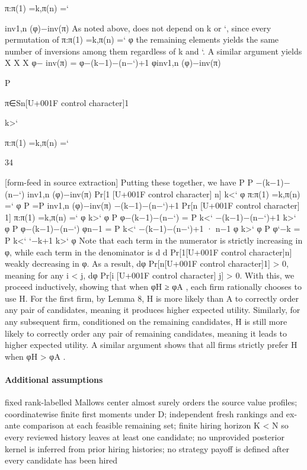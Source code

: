\documentclass[10pt]{article}
\begin{document}
\begin{ReviewVerbatim}
π:π(1) =k,π(n) =`

inv1,n (φ)−inv(π)
As noted above,
does not depend on k or `, since every permutation of
π:π(1) =k,π(n) =` φ
the remaining elements yields the same number of inversions among them regardless of k and `. A similar
argument yields
X
X
X
φ− inv(π) =
φ−(k−1)−(n−`)+1
φinv1,n (φ)−inv(π)

P

π∈Sn[U+001F control character]1

k>`

π:π(1) =k,π(n) =`

34


[form-feed in source extraction]
Putting these together, we have
P
P
−(k−1)−(n−`)
inv1,n (φ)−inv(π)
Pr[1 [U+001F control character] n]
k<` φ
π:π(1) =k,π(n) =` φ
P
=P
inv1,n (φ)−inv(π)
−(k−1)−(n−`)+1
Pr[n [U+001F control character] 1]
π:π(1) =k,π(n) =` φ
k>` φ
P
φ−(k−1)−(n−`)
= P k<` −(k−1)−(n−`)+1
k>` φ
P
φ−(k−1)−(n−`)
φn−1
= P k<` −(k−1)−(n−`)+1 · n−1
φ
k>` φ
P
φ`−k
= P k<` `−k+1
k>` φ
Note that each term in the numerator is strictly increasing in φ, while each term in the denominator is
d
d Pr[1[U+001F control character]n]
weakly decreasing in φ. As a result, dφ
Pr[n[U+001F control character]1] > 0, meaning for any i < j, dφ Pr[i [U+001F control character] j] > 0.
With this, we proceed inductively, showing that when φH ≥ φA , each firm rationally chooses to use H.
For the first firm, by Lemma 8, H is more likely than A to correctly order any pair of candidates, meaning it
produces higher expected utility. Similarly, for any subsequent firm, conditioned on the remaining candidates,
H is still more likely to correctly order any pair of remaining candidates, meaning it leads to higher expected
utility. A similar argument shows that all firms strictly prefer H when φH > φA .
\end{ReviewVerbatim}

\paragraph{Additional assumptions}
\begin{sloppypar}
fixed rank-labelled Mallows center almost surely orders the source value profiles; coordinatewise finite first moments under D; independent fresh rankings and ex-ante comparison at each feasible remaining set; finite hiring horizon K < N so every reviewed history leaves at least one candidate; no unprovided posterior kernel is inferred from prior hiring histories; no strategy payoff is defined after every candidate has been hired
\end{sloppypar}
\end{document}
